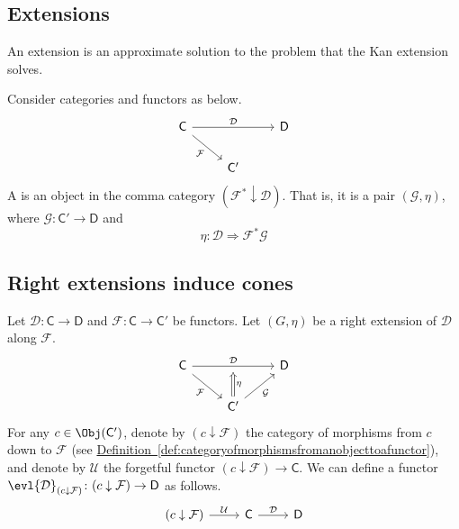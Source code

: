 \documentclass[notes.tex]{subfiles}
\begin{document}
\subsection{Extensions}
\label{ssc:extensions}

An extension is an approximate solution to the problem that the Kan extension solves.

\begin{definition}[extension]
  \label{def:extension}
  Consider categories and functors as below.
  \begin{equation*}
    \begin{tikzcd}
        \mathsf{C}
        \arrow[dr, swap, "\mathcal{F}"]
        \arrow[rr, "\mathcal{D}"]
        && \mathsf{D}
        \\
        & \mathsf{C'}
      \end{tikzcd}
  \end{equation*}
    A  is an object in the comma category $(\mathcal{F}^{*} \downarrow \mathcal{D})$. That is, it is a pair $(\mathcal{G}, \eta)$, where $\mathcal{G}\colon \mathsf{C}' \to \mathsf{D}$ and
    \begin{equation*}
      \eta\colon \mathcal{D} \Rightarrow \mathcal{F}^{*}\mathcal{G}
    \end{equation*}
\end{definition}

\subsection{Right extensions induce cones}
\label{ssc:right_extensions_induce_cones}

Let $\mathcal{D}\colon \mathsf{C} \to \mathsf{D}$ and $\mathcal{F}\colon \mathsf{C} \to \mathsf{C'}$ be functors. Let $(G, \eta)$ be a right extension of $\mathcal{D}$ along $\mathcal{F}$.
\begin{equation*}
  \begin{tikzcd}
    \mathsf{C}
    \arrow[dr, swap, "\mathcal{F}"]
    \arrow[rr, "\mathcal{D}", ""'{name=U}]
    && \mathsf{D}
    \\
    & \mathsf{C'}
    \arrow[ur, swap, "\mathcal{G}"]
    \arrow[d, to=U, Rightarrow, swap, "\eta"] 
  \end{tikzcd}
\end{equation*}
For any $c \in \Obj(\mathsf{C}')$, denote by $(c \downarrow \mathcal{F})$ the category of morphisms from $c$ down to $\mathcal{F}$ (see \hyperref[def:categoryofmorphismsfromanobjecttoafunctor]{Definition~\ref*{def:categoryofmorphismsfromanobjecttoafunctor}}), and denote by $\mathcal{U}$ the forgetful functor $(c \downarrow \mathcal{F}) \to \mathsf{C}$. We can define a functor $\evl{\mathcal{D}}_{(c \downarrow \mathcal{F})}\colon (c \downarrow \mathcal{F}) \to \mathsf{D}$ as follows.
\begin{equation*}
  \begin{tikzcd}
    (c \downarrow \mathcal{F})
    \arrow[r, "\mathcal{U}"]
    & \mathsf{C}
    \arrow[r, "\mathcal{D}"]
    & \mathsf{D}
  \end{tikzcd}
\end{equation*}
\end{document}
